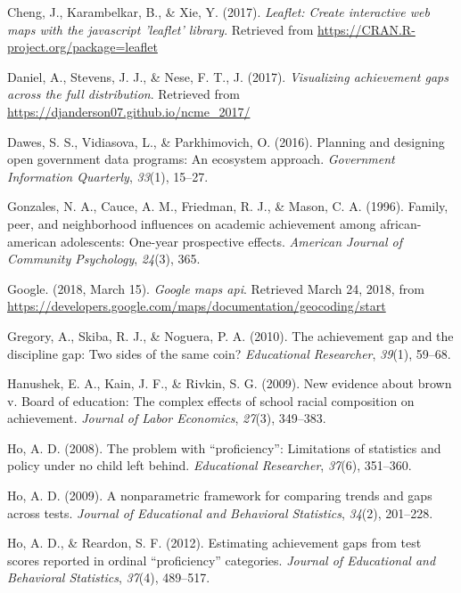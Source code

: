 \documentclass[man, fleqn, noextraspace]{apa6}
\theoremstyle{definition}
\theoremstyle{definition}
\theoremstyle{definition}
\theoremstyle{remark}
\begin{document}
\leavevmode\hypertarget{ref-leaflet}{}%
Cheng, J., Karambelkar, B., \& Xie, Y. (2017). \emph{Leaflet: Create
interactive web maps with the javascript 'leaflet' library}. Retrieved
from \url{https://CRAN.R-project.org/package=leaflet}

\leavevmode\hypertarget{ref-anderson17b}{}%
Daniel, A., Stevens, J. J., \& Nese, F. T., J. (2017). \emph{Visualizing
achievement gaps across the full distribution}. Retrieved from
\url{https://djanderson07.github.io/ncme_2017/}

\leavevmode\hypertarget{ref-dawes16}{}%
Dawes, S. S., Vidiasova, L., \& Parkhimovich, O. (2016). Planning and
designing open government data programs: An ecosystem approach.
\emph{Government Information Quarterly}, \emph{33}(1), 15--27.

\leavevmode\hypertarget{ref-gonzales96}{}%
Gonzales, N. A., Cauce, A. M., Friedman, R. J., \& Mason, C. A. (1996).
Family, peer, and neighborhood influences on academic achievement among
african-american adolescents: One-year prospective effects.
\emph{American Journal of Community Psychology}, \emph{24}(3), 365.

\leavevmode\hypertarget{ref-google}{}%
Google. (2018, March 15). \emph{Google maps api}. Retrieved March 24,
2018, from
\url{https://developers.google.com/maps/documentation/geocoding/start}

\leavevmode\hypertarget{ref-gregory10}{}%
Gregory, A., Skiba, R. J., \& Noguera, P. A. (2010). The achievement gap
and the discipline gap: Two sides of the same coin? \emph{Educational
Researcher}, \emph{39}(1), 59--68.

\leavevmode\hypertarget{ref-hanushek09}{}%
Hanushek, E. A., Kain, J. F., \& Rivkin, S. G. (2009). New evidence
about brown v. Board of education: The complex effects of school racial
composition on achievement. \emph{Journal of Labor Economics},
\emph{27}(3), 349--383.

\leavevmode\hypertarget{ref-ho08}{}%
Ho, A. D. (2008). The problem with ``proficiency'': Limitations of
statistics and policy under no child left behind. \emph{Educational
Researcher}, \emph{37}(6), 351--360.

\leavevmode\hypertarget{ref-ho09}{}%
Ho, A. D. (2009). A nonparametric framework for comparing trends and
gaps across tests. \emph{Journal of Educational and Behavioral
Statistics}, \emph{34}(2), 201--228.

\leavevmode\hypertarget{ref-ho12}{}%
Ho, A. D., \& Reardon, S. F. (2012). Estimating achievement gaps from
test scores reported in ordinal ``proficiency'' categories.
\emph{Journal of Educational and Behavioral Statistics}, \emph{37}(4),
489--517.
\end{document}
